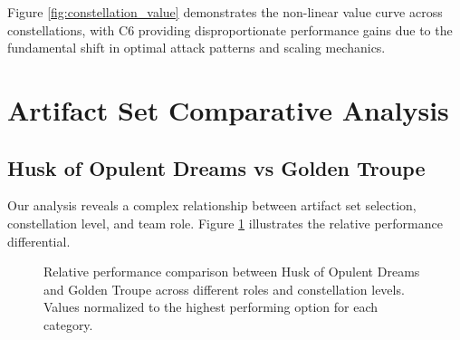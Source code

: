 \documentclass[12pt,a4paper]{article}
\begin{document}
Figure \ref{fig:constellation_value} demonstrates the non-linear value curve across constellations, with C6 providing disproportionate performance gains due to the fundamental shift in optimal attack patterns and scaling mechanics.

\section{Artifact Set Comparative Analysis}

\subsection{Husk of Opulent Dreams vs Golden Troupe}

Our analysis reveals a complex relationship between artifact set selection, constellation level, and team role. Figure \ref{fig:artifact_comparison} illustrates the relative performance differential.

\begin{figure}[H]
\centering
{}
\caption{Relative performance comparison between Husk of Opulent Dreams and Golden Troupe across different roles and constellation levels. Values normalized to the highest performing option for each category.}
\label{fig:artifact_comparison}
\end{figure}
\end{document}
